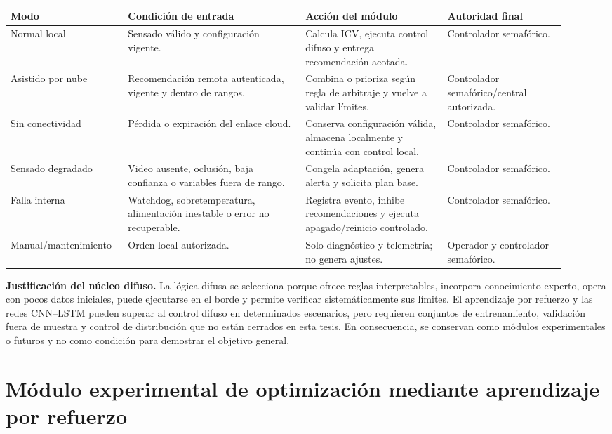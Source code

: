 \documentclass[12pt,a4paper,oneside]{report}
\begin{document}
\begin{longtable}{@{}p{0.18\linewidth}p{0.30\linewidth}p{0.24\linewidth}p{0.20\linewidth}@{}}
\toprule
\textbf{Modo} & \textbf{Condición de entrada} & \textbf{Acción del módulo} & \textbf{Autoridad final}\\
\midrule
\endhead
Normal local & Sensado válido y configuración vigente. & Calcula ICV, ejecuta control difuso y entrega recomendación acotada. & Controlador semafórico.\\
Asistido por nube & Recomendación remota autenticada, vigente y dentro de rangos. & Combina o prioriza según regla de arbitraje y vuelve a validar límites. & Controlador semafórico/central autorizada.\\
Sin conectividad & Pérdida o expiración del enlace cloud. & Conserva configuración válida, almacena localmente y continúa con control local. & Controlador semafórico.\\
Sensado degradado & Video ausente, oclusión, baja confianza o variables fuera de rango. & Congela adaptación, genera alerta y solicita plan base. & Controlador semafórico.\\
Falla interna & Watchdog, sobretemperatura, alimentación inestable o error no recuperable. & Registra evento, inhibe recomendaciones y ejecuta apagado/reinicio controlado. & Controlador semafórico.\\
Manual/mantenimiento & Orden local autorizada. & Solo diagnóstico y telemetría; no genera ajustes. & Operador y controlador semafórico.\\
\bottomrule
\end{longtable}

\textbf{Justificación del núcleo difuso.} La lógica difusa se selecciona porque ofrece reglas interpretables, incorpora conocimiento experto, opera con pocos datos iniciales, puede ejecutarse en el borde y permite verificar sistemáticamente sus límites. El aprendizaje por refuerzo y las redes CNN--LSTM pueden superar al control difuso en determinados escenarios, pero requieren conjuntos de entrenamiento, validación fuera de muestra y control de distribución que no están cerrados en esta tesis. En consecuencia, se conservan como módulos experimentales o futuros y no como condición para demostrar el objetivo general.

\section{Módulo experimental de optimización mediante aprendizaje por refuerzo}\label{motor-de-decisiuxf3n-mediante-aprendizaje-por-refuerzo}
\end{document}
